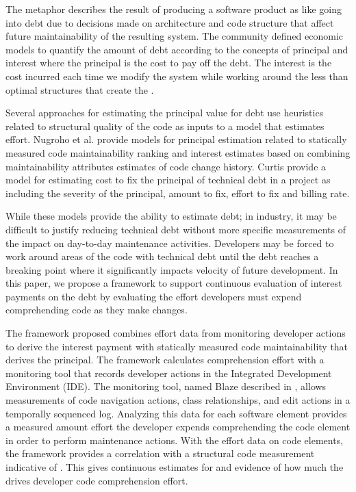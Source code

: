 The \TD metaphor describes the result of producing a software product as like going into debt due to decisions made on architecture and code structure that affect future maintainability of the resulting system\cite{cunningham1992wycash}.  The \TD community defined economic models to quantify the amount of debt according to the concepts of principal and interest where the principal is the cost to pay off the debt.  The interest is the cost incurred each time we modify the system while working around the less than optimal structures that create the \TD.  

Several approaches for estimating the principal value for debt use heuristics related to structural quality of the code as inputs to a model that estimates effort.  Nugroho et al. provide models for principal estimation related to statically measured code maintainability ranking and interest estimates based on combining maintainability attributes estimates of code change history\cite{Nugroho2011Empirical}.  Curtis \etal provide a model for estimating cost to fix the principal of technical debt in a project as including the severity of the principal, amount to fix, effort to fix and billing rate\cite{Curtis2012Estimating}.  

While these models provide the ability to estimate debt; in industry, it may be difficult to justify reducing technical debt without more specific measurements of the impact on day-to-day maintenance activities.  Developers may be forced to work around areas of the code with technical debt until the debt reaches a breaking point \cite{Ozkaya2011Second} where it significantly impacts velocity of future development.  In this paper, we propose a framework to support continuous evaluation of interest payments on the debt by evaluating the effort developers must expend comprehending code as they make changes. 

The framework proposed combines effort data from monitoring developer actions to derive the interest payment with statically measured code maintainability that derives the principal.   The framework calculates comprehension effort with a monitoring tool that records developer actions in the Integrated Development Environment (IDE).  The monitoring tool, named Blaze described in \cite{Snipes2014Experiences}, allows measurements of code navigation actions, class relationships, and edit actions in a temporally sequenced log.  Analyzing this data for each software element provides a measured amount effort the developer expends comprehending the code element in order to perform maintenance actions. With the effort data on code elements, the framework provides a correlation with a structural code measurement indicative of \TD.  This gives continuous estimates for and evidence of how much the \TD drives developer code comprehension effort.


